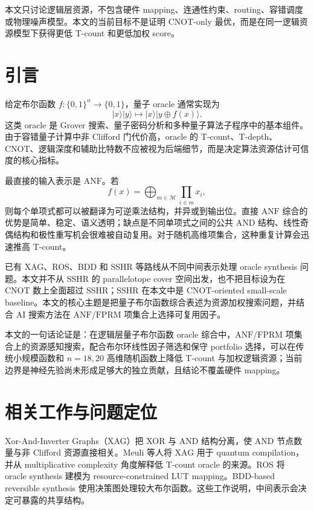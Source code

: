 \documentclass[UTF8,fontset=macnew,11pt]{ctexart}
\newcommand{\anf}{\ensuremath{\mathrm{ANF}}}
\newcommand{\fprm}{\ensuremath{\mathrm{FPRM}}}
\begin{document}
本文只讨论逻辑层资源，不包含硬件 mapping、连通性约束、routing、容错调度或物理噪声模型。本文的当前目标不是证明 CNOT-only 最优，而是在同一逻辑资源模型下获得更低 T-count 和更低加权 score。

\section{引言}

给定布尔函数 $f:\{0,1\}^n\rightarrow\{0,1\}$，量子 oracle 通常实现为
\begin{equation}
  |x\rangle |y\rangle \mapsto |x\rangle |y\oplus f(x)\rangle .
  \label{eq:oracle}
\end{equation}
这类 oracle 是 Grover 搜索、量子密码分析和多种量子算法子程序中的基本组件。由于容错量子计算中非 Clifford 门代价高，oracle 的 T-count、T-depth、CNOT、逻辑深度和辅助比特数不应被视为后端细节，而是决定算法资源估计可信度的核心指标。

最直接的输入表示是 \anf{}。若
\begin{equation}
  f(x)=\bigoplus_{m\in\mathcal{M}}\prod_{i\in m}x_i ,
  \label{eq:anf}
\end{equation}
则每个单项式都可以被翻译为可逆乘法结构，并异或到输出位。直接 \anf{} 综合的优势是简单、稳定、语义透明；缺点是不同单项式之间的公共 AND 结构、线性奇偶结构和极性重写机会很难被自动复用。对于随机高维项集合，这种重复计算会迅速推高 T-count。

已有 XAG、ROS、BDD 和 SSHR 等路线从不同中间表示处理 oracle synthesis 问题\cite{meuli2022xag,meuli2020ros,wille2009bdd,zheng2025sshr}。本文并不从 SSHR 的 parallelotope cover 空间出发，也不把目标设为在 CNOT 数上全面超过 SSHR；SSHR 在本文中是 CNOT-oriented small-scale baseline。本文的核心主题是把量子布尔函数综合表述为资源加权搜索问题，并结合 AI 搜索方法在 \anf{}/\fprm{} 项集合上选择可复用因子。

本文的一句话论证是：在逻辑层量子布尔函数 oracle 综合中，\anf{}/\fprm{} 项集合上的资源感知搜索，配合布尔环线性因子筛选和保守 portfolio 选择，可以在传统小规模函数和 $n=18,20$ 高维随机函数上降低 T-count 与加权逻辑资源；当前边界是神经先验尚未形成足够大的独立贡献，且结论不覆盖硬件 mapping。

\section{相关工作与问题定位}

Xor-And-Inverter Graphs（XAG）把 XOR 与 AND 结构分离，使 AND 节点数量与非 Clifford 资源直接相关。Meuli 等人将 XAG 用于 quantum compilation\cite{meuli2022xag}，并从 multiplicative complexity 角度解释低 T-count oracle 的来源\cite{meuli2019multiplicative}。ROS 将 oracle synthesis 建模为 resource-constrained LUT mapping\cite{meuli2020ros}。BDD-based reversible synthesis 使用决策图处理较大布尔函数\cite{wille2009bdd}。这些工作说明，中间表示会决定可暴露的共享结构。
\end{document}
